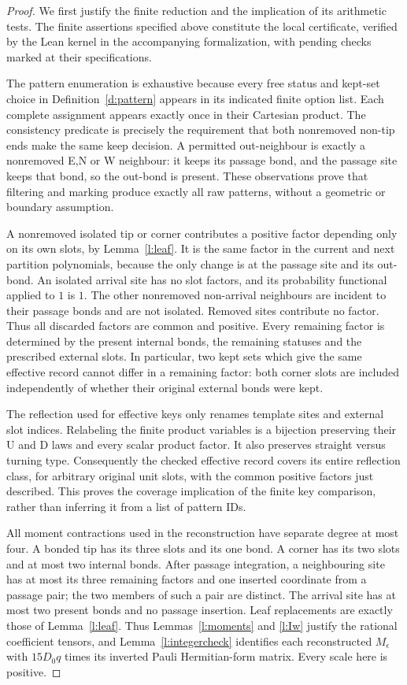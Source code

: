 \begin{proof}
We first justify the finite reduction and the implication of its
arithmetic tests. The finite assertions specified above constitute
the local certificate, verified by the Lean kernel in the accompanying
formalization, with pending checks marked at their specifications.

The pattern enumeration is exhaustive because every free status
and kept-set choice in Definition~\ref{d:pattern} appears in its
indicated finite option list. Each complete assignment appears
exactly once in their Cartesian product. The consistency predicate
is precisely the requirement that both nonremoved non-tip ends
make the same keep decision. A permitted out-neighbour is exactly
a nonremoved E,N or W neighbour: it keeps its passage bond, and
the passage site keeps that bond, so the out-bond is present.
These observations prove that filtering and marking produce
exactly all raw patterns, without a geometric or boundary assumption.

A nonremoved isolated tip or corner contributes a positive factor
depending only on its own slots, by Lemma~\ref{l:leaf}. It is
the same factor in the current and next partition polynomials,
because the only change is at the passage site and its out-bond.
An isolated arrival site has no slot factors, and its probability
functional applied to \(1\) is \(1\). The other nonremoved
non-arrival neighbours are incident to their passage bonds and
are not isolated. Removed sites contribute no factor. Thus all
discarded factors are common and positive. Every remaining factor
is determined by the present internal bonds, the remaining statuses
and the prescribed external slots. In particular, two kept sets
which give the same effective record cannot differ in a remaining
factor: both corner slots are included independently of whether
their original external bonds were kept.

The reflection used for effective keys only renames template sites
and external slot indices. Relabeling the finite product variables
is a bijection preserving their U and D laws and every scalar
product factor. It also preserves straight versus turning type.
Consequently the checked effective record covers its entire
reflection class, for arbitrary original unit slots, with the
common positive factors just described. This proves the coverage
implication of the finite key comparison, rather than inferring it
from a list of pattern IDs.

All moment contractions used in the reconstruction have separate
degree at most four. A bonded tip has its three slots and its one
bond. A corner has its two slots and at most two internal bonds.
After passage integration, a neighbouring site has at most its
three remaining factors and one inserted coordinate from a passage
pair; the two members of such a pair are distinct. The arrival
site has at most two present bonds and no passage insertion.
Leaf replacements are exactly those of Lemma~\ref{l:leaf}.
Thus Lemmas~\ref{l:moments} and \ref{l:Iw} justify the rational
coefficient tensors, and Lemma~\ref{l:integercheck} identifies each
reconstructed \(M_\epsilon\) with \(15D_0q\) times its inverted
Pauli Hermitian-form matrix. Every scale here is positive.


\end{proof}
